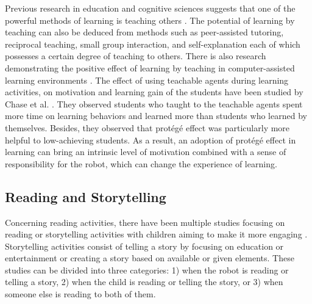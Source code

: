 \documentclass{sigchi}
\begin{document}
Previous research in education and cognitive sciences suggests that one of the powerful methods of learning is teaching others \cite{bargh1980cognitive}.
The potential of learning by teaching can also be deduced from methods such as peer-assisted tutoring, reciprocal teaching, small group interaction, and self-explanation each of which possesses a certain degree of teaching to others. 
There is also research demonstrating the positive effect of learning by teaching in computer-assisted learning environments \cite{biswas2005learning,chase2009teachable}. 
The effect of using teachable agents during learning activities, on motivation and learning gain of the students have been studied by Chase et al. \cite{chase2009teachable}. 
They observed students who taught to the teachable agents spent more time on learning behaviors and learned more than students who learned by themselves.
Besides, they observed that protégé effect was particularly more helpful to low-achieving students. 
As a result, an adoption of protégé effect in learning can bring an intrinsic level of motivation combined with a sense of responsibility for the robot, which can change the experience of learning. 

\subsection{Reading and Storytelling}
Concerning reading activities, there have been multiple studies focusing on reading or storytelling activities with children aiming to make it more engaging \cite{rubegni2016evaluating}. 
Storytelling activities consist of telling a story by focusing on education or entertainment or creating a story based on available or given elements.
These studies can be divided into three categories: 1) when the robot is reading or telling a story, 2) when the child is reading or telling the story, or 3) when someone else is reading to both of them. 
\end{document}
